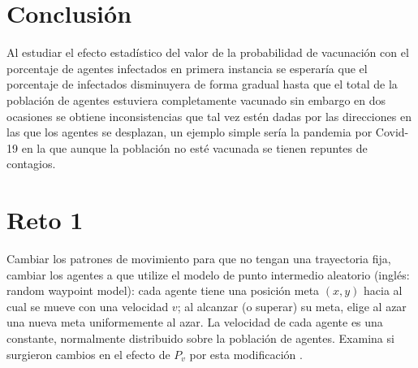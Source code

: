 \documentclass[a4paper]{article}
\begin{document}
\section{Conclusión}
\justify Al estudiar el efecto estadístico del valor de la probabilidad de vacunación con el porcentaje de agentes infectados en primera instancia se esperaría que el porcentaje de infectados disminuyera de forma gradual hasta que el total de la población de agentes estuviera completamente vacunado sin embargo en dos ocasiones se obtiene inconsistencias que tal vez estén dadas por las direcciones en las que los agentes se desplazan, un ejemplo simple sería la pandemia por Covid-19 en la que  aunque la población no esté vacunada se tienen repuntes de contagios.  


\newpage
\section{Reto 1}
\justify Cambiar los patrones de movimiento para que no tengan una trayectoria fija, cambiar los agentes a que utilize el modelo de punto intermedio aleatorio (inglés: random waypoint model): cada agente tiene una posición meta $(x, y)$  hacia al cual se mueve con una velocidad $v$; al alcanzar (o superar) su meta, elige al azar una nueva meta uniformemente al azar. La velocidad de cada agente es una constante, normalmente distribuido sobre la población de agentes. Examina si surgieron cambios en el efecto de $P_v$ por esta modificación \cite{p5}.
\end{document}
